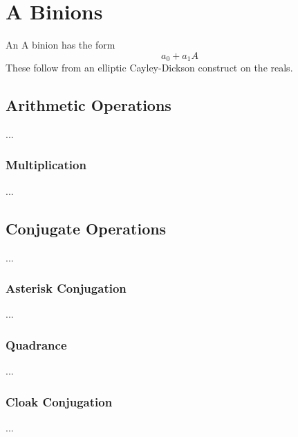 \chapter{A Binions}
An A binion has the form
\begin{equation}
    a_{0} + a_{1} A
\end{equation}
These follow from an elliptic Cayley-Dickson construct on the reals.
\section{Arithmetic Operations}
...
\subsection{Multiplication}
...
\section{Conjugate Operations}
...
\subsection{Asterisk Conjugation}
...
\subsection{Quadrance}
...
\subsection{Cloak Conjugation}
...

